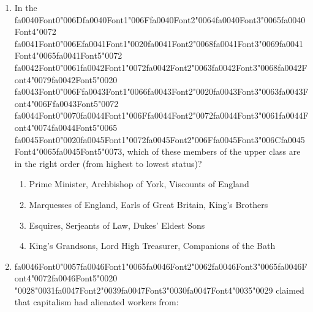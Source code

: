 \documentclass[12pt]{article}
\begin{document}
\begin{enumerate}[label=\arabic*.]
\item In the {\csname fa0040Font0\endcsname\char"006D}{\csname fa0040Font1\endcsname\char"006F}{\csname fa0040Font2\endcsname\char"0064}{\csname fa0040Font3\endcsname\char"0065}{\csname fa0040Font4\endcsname\char"0072} {\csname fa0041Font0\endcsname\char"006E}{\csname fa0041Font1\endcsname\char"0020}{\csname fa0041Font2\endcsname\char"0068}{\csname fa0041Font3\endcsname\char"0069}{\csname fa0041Font4\endcsname\char"0065}{\csname fa0041Font5\endcsname\char"0072} {\csname fa0042Font0\endcsname\char"0061}{\csname fa0042Font1\endcsname\char"0072}{\csname fa0042Font2\endcsname\char"0063}{\csname fa0042Font3\endcsname\char"0068}{\csname fa0042Font4\endcsname\char"0079}{\csname fa0042Font5\endcsname\char"0020} {\csname fa0043Font0\endcsname\char"006F}{\csname fa0043Font1\endcsname\char"0066}{\csname fa0043Font2\endcsname\char"0020}{\csname fa0043Font3\endcsname\char"0063}{\csname fa0043Font4\endcsname\char"006F}{\csname fa0043Font5\endcsname\char"0072} {\csname fa0044Font0\endcsname\char"0070}{\csname fa0044Font1\endcsname\char"006F}{\csname fa0044Font2\endcsname\char"0072}{\csname fa0044Font3\endcsname\char"0061}{\csname fa0044Font4\endcsname\char"0074}{\csname fa0044Font5\endcsname\char"0065} {\csname fa0045Font0\endcsname\char"0020}{\csname fa0045Font1\endcsname\char"0072}{\csname fa0045Font2\endcsname\char"006F}{\csname fa0045Font3\endcsname\char"006C}{\csname fa0045Font4\endcsname\char"0065}{\csname fa0045Font5\endcsname\char"0073}, which of these members of the upper class are in the right order (from highest to lowest status)?
\begin{enumerate}[label=(\alph*)]
    \item Prime Minister, Archbishop of York, Viscounts of England
    \item Marquesses of England, Earls of Great Britain, King's Brothers
    \item Esquires, Serjeants of Law, Dukes' Eldest Sons
    \item King's Grandsons, Lord High Treasurer, Companions of the Bath
\end{enumerate}
\item {\csname fa0046Font0\endcsname\char"0057}{\csname fa0046Font1\endcsname\char"0065}{\csname fa0046Font2\endcsname\char"0062}{\csname fa0046Font3\endcsname\char"0065}{\csname fa0046Font4\endcsname\char"0072}{\csname fa0046Font5\endcsname\char"0020} {\char"0028}{\char"0031}{\csname fa0047Font2\endcsname\char"0039}{\csname fa0047Font3\endcsname\char"0030}{\csname fa0047Font4\endcsname\char"0035}{\char"0029} claimed that capitalism had alienated workers from:

\end{enumerate}
\end{document}
